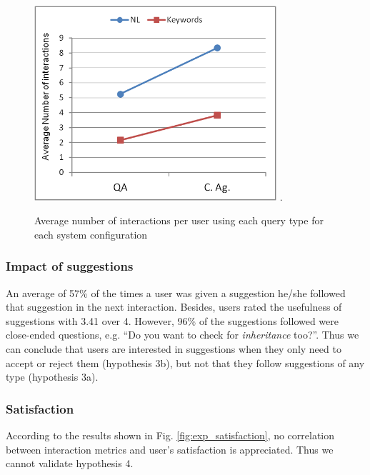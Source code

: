 \begin{figure}[!tbh]
  \centering
  \includegraphics[width=0.8\textwidth]{img/test/exp_querytype.png}
  \DeclareGraphicsExtensions.  
  \caption{Average number of interactions per user using each query type for each system configuration}
  \label{fig:exp_querytype}
\end{figure}

\subsubsection{Impact of suggestions}

An average of 57\% of the times a user was given a suggestion he/she followed that suggestion in the next interaction. Besides, users rated the usefulness of suggestions with 3.41 over 4. However, 96\% of the suggestions followed were close-ended questions, e.g. ``Do you want to check for {\em inheritance} too?''. Thus we can conclude that users are interested in suggestions when they only need to accept or reject them (hypothesis 3b), but not that they follow suggestions of any type (hypothesis 3a). %


\subsubsection{Satisfaction}

According to the results shown in Fig. \ref{fig:exp_satisfaction}, no correlation between interaction metrics and user's satisfaction is appreciated. Thus we cannot validate hypothesis 4. 

